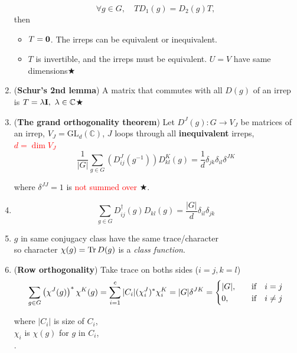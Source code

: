\documentclass{article}
\theoremstyle{remark}
\theoremstyle{remark}
\newcommand{\where}[1]{\begin{flushright}where #1.\end{flushright}}
\newcommand{\mylabel}[2]{\hyperref[#1]{#2}\label{back:#1}}
\begin{document}
\begin{enumerate}
\[                    \forall g\in G,\quad TD_1(g)=D_2(g)T,
                \] 
            then \begin{itemize}
                \item $T=\vb{0}$. The irreps can be equivalent or inequivalent.
                \item $T$ is invertible, and the irreps must be equivalent. $U=V$ have same dimensions\mylabel{lma:schur1}{$\bigstar$}
            \end{itemize}
        \item (\textbf{Schur's 2nd lemma}) A matrix that commutes with all $D(g)$ of an irrep is $T=\lambda\vb{I},\ \lambda\in\mathbb{C}$\mylabel{lma:schur2}{$\bigstar$}
        \item (\textbf{The grand orthogonality theorem}) Let $D^J(g):G\rightarrow V_J$ be matrices of an irrep, $V_J=\text{GL}_d(\mathbb{C})$, $J$ loops through all \textbf{inequivalent} irreps, \textcolor{red}{$d=\dim V_J$}
                \[
                    \frac{1}{|G|}\sum_{g\in G}(D_{ij}^J(g^{-1})) D_{kl}^K(g)=\frac{1}{d}\delta_{jk}\delta_{il}\delta^{JK}
                \]\where{$\delta^{JJ}=1$ is \textcolor{red}{not summed over} \mylabel{thm:grand_orthogonality}{$\bigstar$}}
        \item \[
                \boxed{\sum_{g\in G}D_{ij}^\dagger(g)D_{kl}(g)=\frac{|G|}{d}\delta_{il}\delta_{jk}}
            \]
        \item $g$ in same conjugacy class have the same trace/character\\ so character $\chi(g)=\Tr D(g)$ is a \emph{class function}.
        \item (\textbf{Row orthogonality}) Take trace on boths sides ($i=j,k=l$)\[
            \sum_{g\in G}\left(\chi^J(g)\right)^*\chi^K(g) = \sum_{i=1}^c |C_i|(\chi^J_i)^*\chi^K_i =|G|\delta^{JK}=\begin{cases}
                                                                                                                        |G|,& \qif i=j\\
                                                                                                                        0,& \qif i\neq j
                                                                                                                    \end{cases}
            \]\where{$|C_i|$ is size of $C_i$,\\
                $\chi_i$ is $\chi(g)$ for $g$ in $C_i$,\\
}
\end{enumerate}
\end{document}
